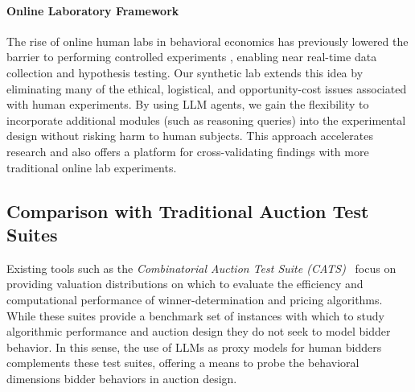 \documentclass{article} %
\begin{document}
\paragraph{Online Laboratory Framework}
The rise of online human labs \citep{horton2011online} in behavioral economics has previously lowered the barrier to performing controlled experiments \citep{oprea2024decisions, enke2024behavioral}, enabling near real-time data collection and hypothesis testing. 
Our synthetic lab extends this idea by eliminating many of the ethical, logistical, and opportunity-cost issues associated with human experiments. 
By using LLM agents, we gain the flexibility to incorporate additional modules (such as reasoning queries) into the experimental design without risking harm to human subjects. 
This approach accelerates research and also offers a platform for cross-validating findings with more traditional online lab experiments.

\subsection{Comparison with Traditional Auction Test Suites}

Existing tools such as the {\em Combinatorial Auction Test Suite (CATS)}~\citep{leyton2000towards}  focus on  providing valuation distributions on which to evaluate the efficiency and computational performance of winner-determination and pricing algorithms.  While these suites provide a benchmark
set of instances with which to study algorithmic performance and auction
design  they
do not seek to model bidder behavior. In this sense, the use of LLMs as proxy models for human bidders
complements these test suites, offering  a means to probe the behavioral dimensions 
bidder behaviors in auction design.

\end{document}
